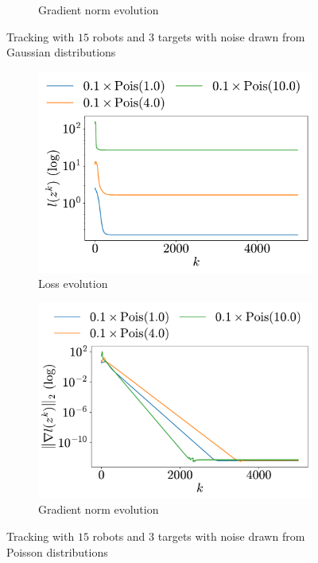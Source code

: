 \documentclass[a4paper,11pt,oneside]{book}
\begin{document}
\begin{figure}[htb!]
\begin{subfigure}[h]{0.43\linewidth}
            \caption{Gradient norm evolution}
      \end{subfigure}
      \caption{Tracking with $15$ robots and $3$ targets with noise drawn from Gaussian distributions}
      \label{fig:tracking_gaussian_15_3}
\end{figure}

\begin{figure}[H]
      \centering
      \begin{subfigure}[h]{0.43\linewidth}
            \centering
            \includegraphics[width=\linewidth]{./figs/tracking/poisson/loss.pdf} 
            \caption{Loss evolution}
      \end{subfigure}
      \hfill
      \begin{subfigure}[h]{0.43\linewidth}
            \centering
            \includegraphics[width=\linewidth]{./figs/tracking/poisson/gradient.pdf} 
            \caption{Gradient norm evolution}
      \end{subfigure}
      \caption{Tracking with $15$ robots and $3$ targets with noise drawn from Poisson distributions}
      \label{fig:tracking_poisson_15_3}
\end{figure}
\end{document}
